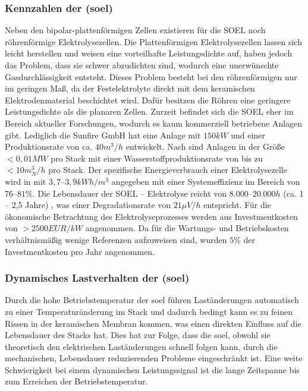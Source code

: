 \documentclass[onecolumn,10pt,titlepage]{article}
\begin{document}
			
			\subsubsection*{Kennzahlen der (\gls{soel})}	
			Neben den bipolar-plattenförmigen Zellen existieren für die SOEL noch röhrenförmige Elektrolysezellen. Die Plattenförmigen Elektrolysezellen lassen sich leicht herstellen und weisen eine vorteilhafte Leistungsdichte auf, haben jedoch das Problem, dass sie schwer abzudichten sind, wodurch eine unerwünschte Gasdurchlässigkeit entsteht. Dieses Problem besteht bei den röhrenförmigen nur im geringen Maß, da der Festelektrolyte direkt mit dem keramischen Elektrodenmaterial beschichtet wird. Dafür besitzen die Röhren eine geringere Leistungsdichte als die planaren Zellen. 
			Zurzeit befindet sich die SOEL eher im Bereich aktueller Forschungen, wodurch es kaum kommerziell betriebene Anlagen gibt. Lediglich die Sunfire GmbH hat eine Anlage mit $150kW$ und einer Produktionsrate von ca. $40 m^3/h$ entwickelt.\cite{Sunfire.2017} Nach \cite{Buttler.2018} sind Anlagen in der Größe $<0,01 MW$ pro Stack mit einer Wasserstoffproduktionsrate von bis zu $<10 m^3_N/h$ pro Stack. Der spezifische Energieverbrauch einer Elektrolysezelle wird in \cite{Buttler.2018} mit $3,7–3,9 kWh/m^3$ angegeben mit einer Systemeffizienz im Bereich von $76–81\%$. Die Lebensdauer der SOEL – Elektrolyse reicht von $8.000–20.000 h$ (ca. 1 – 2,5 Jahre) \cite{DeNiangThe.12.2015}, was einer Degradationsrate von  $21 \mu V/h$ entspricht. Für die ökonomische Betrachtung des Elektrolyseprozesses werden aus \cite{Buttler.2018}  Investmentkosten von $>2500 EUR/kW$ angenommen. Da für die Wartungs- und Betriebskosten verhältnismäßig wenige Referenzen aufzuweisen sind, wurden $5 \%$ der Investmentkosten pro Jahr angenommen.
			
			\subsubsection*{Dynamisches Lastverhalten der (\gls{soel})}	
			Durch die hohe Betriebstemperatur der \gls{soel} führen Laständerungen automatisch zu einer Temperaturänderung im Stack und dadurch bedingt kann es zu feinen Rissen in der keramischen Membran kommen, was einen direkten Einfluss auf die Lebensdauer des Stacks hat. Dies hat zur Folge, dass die \gls{soel}, obwohl sie theoretisch den elektrischen Laständerungen schnell folgen kann, durch die mechanischen, Lebensdauer reduzierenden Probleme eingeschränkt ist. Eine weite Schwierigkeit bei einem dynamischen Leistungssignal ist die lange Zeitspanne bis zum Erreichen der Betriebstemperatur.
\end{document}
